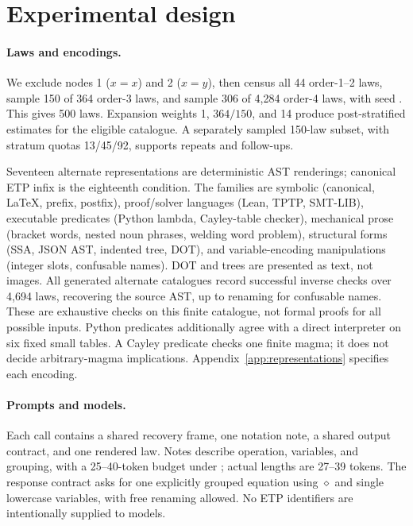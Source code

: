 \documentclass{article}
\newcommand{\code}[1]{\texttt{\detokenize{#1}}}
\begin{document}
\section{Experimental design}
\label{sec:design}

\paragraph{Laws and encodings.}
We exclude nodes 1 ($x=x$) and 2 ($x=y$), then census all 44 order-1--2 laws,
sample 150 of 364 order-3 laws, and sample 306 of 4,284 order-4 laws, with seed
\code{20260830}. This gives 500 laws. Expansion weights 1, $364/150$, and 14
produce post-stratified estimates for the eligible catalogue. A separately
sampled 150-law subset, with stratum quotas 13/45/92, supports repeats and
follow-ups.

Seventeen alternate representations are deterministic AST renderings; canonical
ETP infix is the eighteenth condition. The families are symbolic (canonical,
LaTeX, prefix, postfix), proof/solver languages (Lean, TPTP, SMT-LIB), executable
predicates (Python lambda, Cayley-table checker), mechanical prose (bracket
words, nested noun phrases, welding word problem), structural forms (SSA, JSON
AST, indented tree, DOT), and variable-encoding manipulations (integer slots,
confusable names). DOT and trees are presented as text, not images.
All generated alternate catalogues record successful inverse checks over 4,694
laws, recovering the source AST, up to renaming for confusable names.
These are exhaustive checks on this finite catalogue, not formal proofs for all
possible inputs. Python predicates additionally agree with a direct interpreter
on six fixed small tables. A Cayley predicate checks one finite magma; it does
not decide arbitrary-magma implications. Appendix~\ref{app:representations}
specifies each encoding.

\paragraph{Prompts and models.}
Each call contains a shared recovery frame, one notation note, a shared output
contract, and one rendered law. Notes describe operation, variables, and
grouping, with a 25--40-token budget under \code{cl100k_base}; actual lengths
are 27--39 tokens. The response contract asks for one explicitly grouped equation
using $\diamond$ and single lowercase variables, with free renaming allowed.
No ETP identifiers are intentionally supplied to models.
\end{document}
